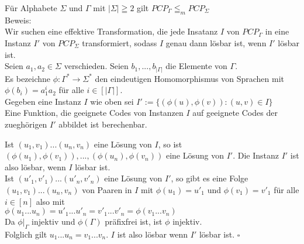 \begin{lemma}{}
    Für Alphabete $\Sigma$ und $\Gamma$ mit $|\Sigma| \geqq 2$ gilt $PCP_{\Gamma} \leqq_m PCP_{\Sigma}$ \\

    Beweis: \\
    Wir suchen eine effektive Transformation, die jede Insatanz $I$ von $PCP_\Gamma$ in eine Instanz $I'$ von
    $PCP_\Sigma$ transformiert, sodass $I$ genau dann lösbar ist, wenn $I'$ lösbar ist. \\

    Seien $a_1,a_2 \in \Sigma$ verschieden. Seien $b_1,...,b_{|\Gamma|}$ die Elemente von $\Gamma$. \\
    Es bezeichne $\phi : \Gamma^* \rightarrow \Sigma^*$ den eindeutigen Homomorphismus von Sprachen mit
    $\phi(b_i) = a_1^i a_2$ für alle $i \in [|\Gamma|]$. \\

    Gegeben eine Instanz $I$ wie oben sei $I':=\{(\phi(u),\phi(v)):(u,v) \in I\}$ \\
    Eine Funktion, die geeignete Codes von Instanzen $I$ auf geeignete Codes der zueghörigen $I'$ abbildet
    ist berechenbar.
    
    Ist $(u_1,v_1)...(u_n,v_n)$ eine Lösung von $I$, so ist $(\phi(u_1),\phi(v_1)),...,(\phi(u_n),\phi(v_n))$
    eine Lösung von $I'$. Die Instanz $I'$ ist also lösbar, wenn $I$ lösbar ist. \\

    Ist $(u'_1,v'_1)...(u'_n,v'_n)$ eine Lösung von $I'$, so gibt es eine Folge $(u_1,v_1)...(u_n,v_n)$ von Paaren in
    $I$ mit $\phi(u_1)=u'_1$ und $\phi(v_1)=v'_1$ für alle $i \in [n]$ also mit \\
    $\phi(u_1...u_n) = u'_1...u'_n = v'_1 ...v'_n = \phi(v_1...v_n)$ \\

    Da $\phi|_\Gamma$ injektiv und $\phi(\Gamma)$ präfixfrei ist, ist $\phi$ injektiv. \\
    Folglich gilt $u_1...u_n = v_1...v_n$. $I$ ist also lösbar wenn $I'$ lösbar ist. $\square$
\end{lemma}

